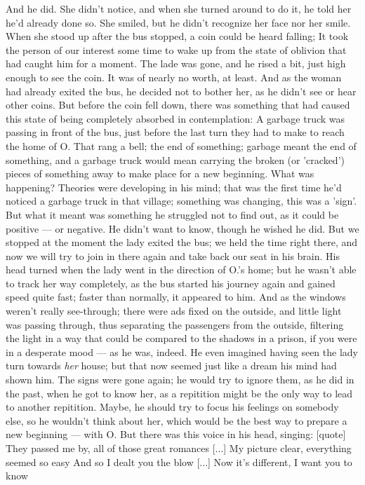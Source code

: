 And he did. 
She didn't notice, and when she turned around to do it, he told her he'd already done so. 
She smiled, but he didn't recognize her face nor her smile. 
When she stood up after the bus stopped, a coin could be heard falling; It took the person of our interest some time to wake up from the state of oblivion that had caught him for a moment. The lade was gone, and he rised a bit, just high enough to see the coin. 
It was of nearly no worth, at least. And as the woman had already exited the bus, he decided not to bother her, as he didn't see or hear other coins. 
But before the coin fell down, there was something that had caused this state of being completely absorbed in contemplation: A garbage truck was passing in front of the bus, just before the last turn they had to make to reach the home of O. 
That rang a bell; the end of something; garbage meant the end of something, and a garbage truck would mean carrying the broken (or 'cracked') pieces of something away to make place for a new beginning. 
What was happening?
Theories were developing in his mind; that was the first time he'd noticed a garbage truck in that village; something was changing, this was a 'sign'. 
But what it meant was something he struggled not to find out, as it could be positive --- or negative. 
He didn't want to know, though he wished he did. 
But we stopped at the moment the lady exited the bus; we held the time right there, and now we will try to join in there again and take back our seat in his brain. 
His head turned when the lady went in the direction of O.'s home; but he wasn't able to track her way completely, as the bus started his journey again and gained speed quite fast; faster than normally, it appeared to him. And as the windows weren't really see-through; there were ads fixed on the outside, and little light was passing through, thus separating the passengers from the outside, filtering the light in a way that could be compared to the shadows in a prison, if you were in a desperate mood --- as he was, indeed. 
He even imagined having seen the lady turn towards \emph{her} house; but that now seemed just like a dream his mind had shown him. 
The signs were gone again; he would try to ignore them, as he did in the past, when he got to know her, as a repitition might be the only way to lead to another repitition. Maybe, he should try to focus his feelings on somebody else, so he wouldn't think about her, which would be the best way to prepare a new beginning --- with O. 
But there was this voice in his head, singing:
[quote]
They passed me by, all of those great romances 
[...]
My picture clear, everything seemed so easy 
And so I dealt you the blow 
[...]
Now it's different, I want you to know 
 
